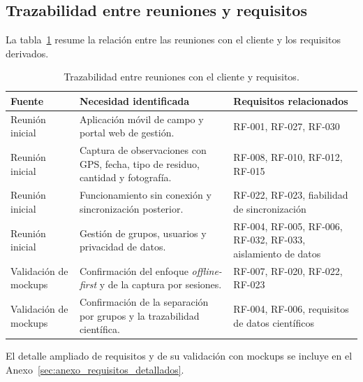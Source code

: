 \subsection{Trazabilidad entre reuniones y requisitos}

La tabla~\ref{tab:trazabilidad_reuniones} resume la relación entre las reuniones con
el cliente y los requisitos derivados.

\begin{table}[H]
  \centering
  \caption{Trazabilidad entre reuniones con el cliente y requisitos.}
  \label{tab:trazabilidad_reuniones}
  \begin{tabularx}{\textwidth}{p{3cm}X p{3cm}}
    \toprule
    \textbf{Fuente} & \textbf{Necesidad identificada} & \textbf{Requisitos relacionados} \\
    \midrule
    Reunión inicial & Aplicación móvil de campo y portal web de gestión. & RF-001, RF-027, RF-030 \\
    Reunión inicial & Captura de observaciones con GPS, fecha, tipo de residuo, cantidad y fotografía. & RF-008, RF-010, RF-012, RF-015 \\
    Reunión inicial & Funcionamiento sin conexión y sincronización posterior. & RF-022, RF-023, fiabilidad de sincronización \\
    Reunión inicial & Gestión de grupos, usuarios y privacidad de datos. & RF-004, RF-005, RF-006, RF-032, RF-033, aislamiento de datos \\
    Validación de mockups & Confirmación del enfoque \textit{offline-first} y de la captura por sesiones. & RF-007, RF-020, RF-022, RF-023 \\
    Validación de mockups & Confirmación de la separación por grupos y la trazabilidad científica. & RF-004, RF-006, requisitos de datos científicos \\
    \bottomrule
  \end{tabularx}
\end{table}

El detalle ampliado de requisitos y de su validación con mockups se
incluye en el Anexo~\ref{sec:anexo_requisitos_detallados}.
